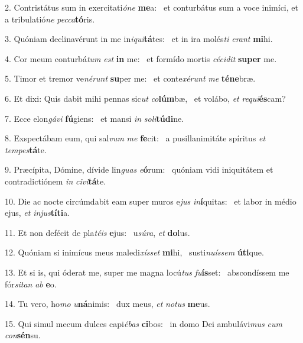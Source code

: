 2. Contristátus sum in exercitati\textit{ó}\textit{ne} \textbf{me}a: \ast\  et conturbátus sum a voce inimíci, et a tribulatió\textit{ne} \textit{pec}\textit{ca}\textbf{tó}ris.\

3. Quóniam declinavérunt in me in\textit{i}\textit{qui}\textbf{tá}tes: \ast\  et in ira molés\textit{ti} \textit{e}\textit{rant} \textbf{mi}hi.\

4. Cor meum conturbá\textit{tum} \textit{est} \textbf{in} me: \ast\  et formído mortis \textit{cé}\textit{ci}\textit{dit} \textbf{su}\textbf{per} me.\

5. Timor et tremor ve\textit{né}\textit{runt} \textbf{su}per me: \ast\  et conte\textit{xé}\textit{runt} \textit{me} \textbf{té}\textbf{ne}bræ.\

6. Et dixi: Quis dabit mihi pennas sic\textit{ut} \textit{co}\textbf{lúm}bæ, \ast\  et volábo, \textit{et} \textit{re}\textit{qui}\textbf{és}cam?\

7. Ecce elon\textit{gá}\textit{vi} \textbf{fú}giens: \ast\  et mansi \textit{in} \textit{so}\textit{li}\textbf{tú}\textbf{di}ne.\

8. Exspectábam eum, qui sal\textit{vum} \textit{me} \textbf{fe}cit: \ast\  a pusillanimitáte spíritus \textit{et} \textit{tem}\textit{pes}\textbf{tá}te.\

9. Præcípita, Dómine, dívide lin\textit{guas} \textit{e}\textbf{ó}rum: \ast\  quóniam vidi iniquitátem et contradictiónem \textit{in} \textit{ci}\textit{vi}\textbf{tá}te.\

10. Die ac nocte circúmdabit eam super muros e\textit{jus} \textit{in}\textbf{í}quitas: \ast\  et labor in médio ejus, \textit{et} \textit{in}\textit{jus}\textbf{tí}\textbf{ti}a.\

11. Et non defécit de pla\textit{té}\textit{is} \textbf{e}jus: \ast\  u\textit{sú}\textit{ra}, \textit{et} \textbf{do}lus.\

12. Quóniam si inimícus meus maledi\textit{xís}\textit{set} \textbf{mi}hi, \ast\  susti\textit{nu}\textit{ís}\textit{sem} \textbf{ú}\textbf{ti}que.\

13. Et si is, qui óderat me, super me magna locú\textit{tus} \textit{fu}\textbf{ís}set: \ast\  abscondíssem me fór\textit{si}\textit{tan} \textit{ab} \textbf{e}o.\

14. Tu vero, ho\textit{mo} \textit{u}\textbf{ná}nimis: \ast\  dux meus, \textit{et} \textit{no}\textit{tus} \textbf{me}us.\

15. Qui simul mecum dulces capi\textit{é}\textit{bas} \textbf{ci}bos: \ast\  in domo Dei ambulávi\textit{mus} \textit{cum} \textit{con}\textbf{sén}su.\

